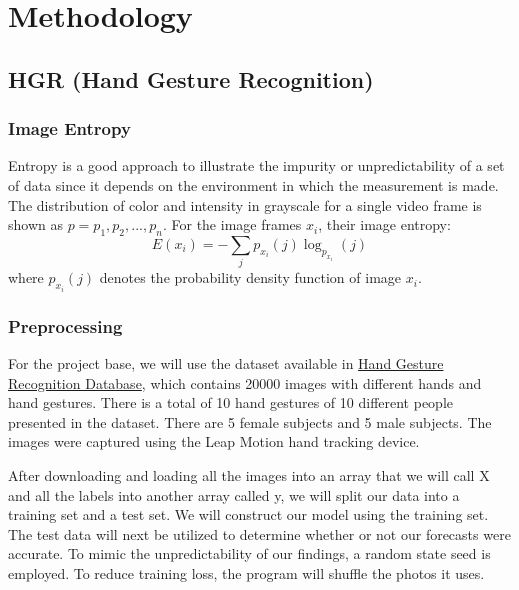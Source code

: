 \documentclass[letterpaper, 10 pt, conference]{ieeeconf}  %
\begin{document}
\section{Methodology}
\subsection*{\bf HGR (Hand Gesture Recognition)}
\subsubsection*{\bf Image Entropy} Entropy is a good approach to illustrate the impurity or unpredictability of a set of data since it depends on the environment in which the measurement is made. The distribution of color and intensity in grayscale for a single video frame is shown as $p = {p_1, p_2, ..., p_n}$. For the image frames $x_i$, their image entropy: 
$$E(x_i) = - \sum_{j}p_{x_i}(j)\log_{p_{x_i}}(j)$$
where $p_{x_i}(j)$ denotes the probability density function of image $x_i$.

\subsubsection*{\bf Preprocessing}
For the project base, we will use the dataset available in \href{https://www.kaggle.com/gti-upm/leapgestrecog/version/1}{Hand Gesture Recognition Database}, which contains 20000 images with different hands and hand gestures. There is a total of 10 hand gestures of 10 different people presented in the dataset. There are 5 female subjects and 5 male subjects. The images were captured using the Leap Motion hand tracking device. \par

After downloading and loading all the images into an array that we will call X and all the labels into another array called y, we will split our data into a training set and a test set. We will construct our model using the training set. The test data will next be utilized to determine whether or not our forecasts were accurate. To mimic the unpredictability of our findings, a random state seed is employed. To reduce training loss, the program will shuffle the photos it uses. \par
\end{document}

